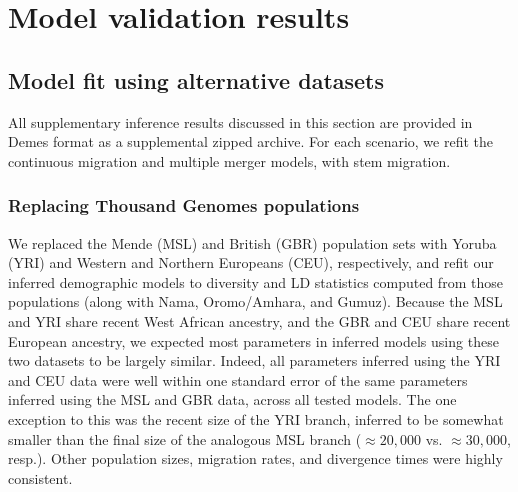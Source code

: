 \documentclass[]{article}
\begin{document}
\section{Model validation results}\label{sec:supp-results}
\label{sec:validation_results}
\subsection{Model fit using alternative datasets}
\label{sec:supp-alt-data}

All supplementary inference results discussed in this section are provided in
Demes format \citep{Gower2022-yn} as a supplemental zipped archive. For each
scenario, we refit the continuous migration and multiple merger models, with
stem migration.

\subsubsection{Replacing Thousand Genomes populations}
\label{sec:replacing}
We replaced the Mende (MSL) and British (GBR) population sets with Yoruba (YRI)
and Western and Northern Europeans (CEU), respectively, and refit our inferred
demographic models to diversity and LD statistics computed from those
populations (along with Nama, Oromo/Amhara, and Gumuz). Because the MSL and YRI
share recent West African ancestry, and the GBR and CEU share recent European
ancestry, we expected most parameters in inferred models using these two
datasets to be largely similar. Indeed, all parameters inferred using the YRI
and CEU data were well within one standard error of the same parameters
inferred using the MSL and GBR data, across all tested models. The one
exception to this was the recent size of the YRI branch, inferred to be
somewhat smaller than the final size of the analogous MSL branch ($\approx
20,000$ vs. $\approx 30,000$, resp.). Other population sizes, migration rates,
and divergence times were highly consistent.
\end{document}
